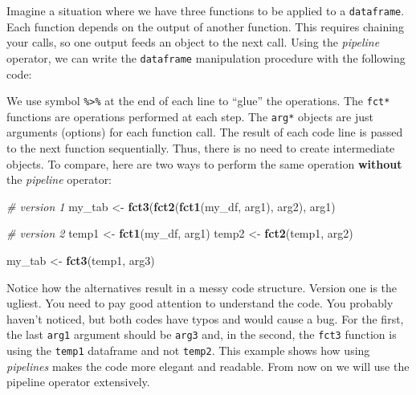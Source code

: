 \documentclass[
  12pt,
]{book}
\newenvironment{Shaded}{\begin{snugshade}}{\end{snugshade}}
\newcommand{\CommentTok}[1]{\textcolor[rgb]{0.37,0.37,0.37}{\textit{#1}}}
\newcommand{\KeywordTok}[1]{\textcolor[rgb]{0.27,0.27,0.27}{\textbf{#1}}}
\newcommand{\NormalTok}[1]{#1}
\newcommand{\OperatorTok}[1]{\textcolor[rgb]{0.43,0.43,0.43}{\textbf{#1}}}
\newcommand{\StringTok}[1]{\textcolor[rgb]{0.5,0.5,0.5}{#1}}
\begin{document}
Imagine a situation where we have three functions to be applied to a \texttt{dataframe}. Each function depends on the output of another function. This requires chaining your calls, so one output feeds an object to the next call. Using the \emph{pipeline} operator, we can write the \texttt{dataframe} manipulation procedure with the following code: 

\begin{Shaded}
\end{Shaded}

We use symbol \texttt{\%\textgreater{}\%} at the end of each line to ``glue'' the operations. The \texttt{fct*} functions are operations performed at each step. The \texttt{arg*} objects are just arguments (options) for each function call. The result of each code line is passed to the next function sequentially. Thus, there is no need to create intermediate objects. To compare, here are two ways to perform the same operation \textbf{without} the \emph{pipeline} operator:

\begin{Shaded}
\begin{Highlighting}[]
\CommentTok{# version 1}
\NormalTok{my_tab <-}\StringTok{ }\KeywordTok{fct3}\NormalTok{(}\KeywordTok{fct2}\NormalTok{(}\KeywordTok{fct1}\NormalTok{(my_df,}
\NormalTok{                         arg1),}
\NormalTok{                    arg2),}
\NormalTok{               arg1)}

\CommentTok{# version 2}
\NormalTok{temp1 <-}\StringTok{ }\KeywordTok{fct1}\NormalTok{(my_df, arg1)}
\NormalTok{temp2 <-}\StringTok{ }\KeywordTok{fct2}\NormalTok{(temp1, arg2)}

\NormalTok{my_tab <-}\StringTok{ }\KeywordTok{fct3}\NormalTok{(temp1, arg3)}
\end{Highlighting}
\end{Shaded}

Notice how the alternatives result in a messy code structure. Version one is the ugliest. You need to pay good attention to understand the code. You probably haven't noticed, but both codes have typos and would cause a bug. For the first, the last \texttt{arg1} argument should be \texttt{arg3} and, in the second, the \texttt{fct3} function is using the \texttt{temp1} dataframe and not \texttt{temp2}. This example shows how using \emph{pipelines} makes the code more elegant and readable. From now on we will use the pipeline operator extensively.
\end{document}
